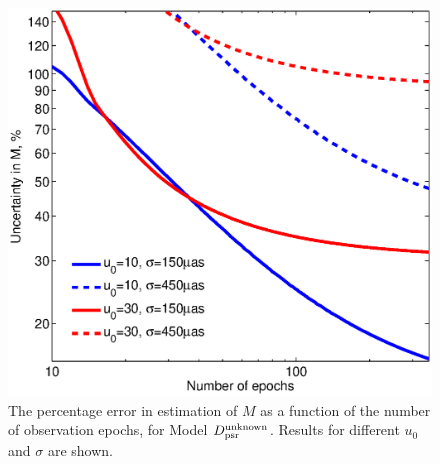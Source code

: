 \documentclass[iop,apj]{emulateapj}
\begin{document}
\begin{figure}
\begin{center}
  \includegraphics[width=3.5 in]{mass_7.eps}
%
\caption{The percentage error in estimation of $M$ as a function of the number of observation epochs,
for Model $D_{\rm{psr}}^{\rm{unknown}}$. Results for different $u_0$ and $\sigma$ are shown. }
\label{mass_7}
\end{center}
\end{figure}
%
\end{document}
